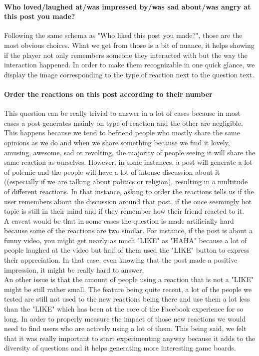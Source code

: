 \paragraph{Who loved/laughed at/was impressed by/was sad about/was angry at this post you made?}
Following the same schema as "Who liked this post you made?", those are the most obvious choices. What we get from those is a bit of nuance, it helps showing if the player not only remembers someone they interacted with but the way the interaction happened. In order to make them  recognizable in one quick glance, we display the image corresponding to the type of reaction next to the question text. 
\paragraph{Order the reactions on this post according to their number}
This question can be really trivial to answer in a lot of cases because in most cases a post generates mainly on type of reaction and the other are negligible. This happens because we tend to befriend people who mostly share the same opinions as we do and when we share something because we find it lovely, amusing, awesome, sad or revolting, the majority of people seeing it will share the same reaction as ourselves. However, in some instances, a post will generate a lot of polemic and the people will have a lot of intense discussion about it ((especially if we are talking about politics or religion), resulting in a multitude of different reactions. In that instance, asking to order the reactions tells us if the user remembers about the discussion around that post, if the once seemingly hot topic is still in their mind and if they remember how their friend reacted to it.\\
A caveat would be that in some cases the question is made artificially hard because some of the reactions are two similar. For instance, if the post is about a funny video, you might get nearly as much "LIKE" as "HAHA" because a lot of people laughed at the video but half of them used the "LIKE" button to express their appreciation. In that case, even knowing that the post made a positive impression, it might be really hard to answer.\\
An other issue is that the amount of people using a reaction that is not a "LIKE" might be still rather small. The feature being quite recent, a lot of the people we tested are still not used to the new reactions being there and use them a lot less than the "LIKE" which has been at the core of the Facebook experience for so long. In order to properly measure the impact of those new reactions we would need to find users who are actively using a lot of them. This being said, we felt that it was really important to start experimenting anyway because it adds to the diversity of questions and it helps generating more interesting game boards.\\

